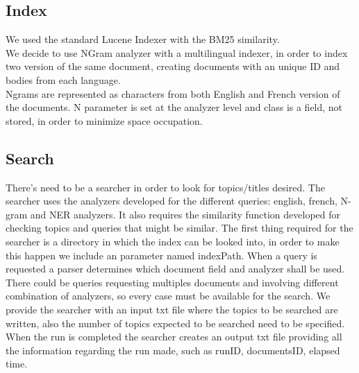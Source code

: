 \subsection{Index}\label{subsec:index}
We used the standard Lucene Indexer with the BM25\cite{BM25} similarity.\\
We decide to use NGram analyzer with a multilingual indexer,
in order to index two version of the same document, creating documents with
an unique ID and bodies from each language.\\
Ngrams are represented as characters from both English and French version of
the documents. N parameter is set at the analyzer level and class is a field,
not stored, in order to minimize space occupation.\\

\subsection{Search}\label{subsec:search}
There's need to be a searcher in order to look for topics/titles desired. The searcher uses the analyzers developed for
the different queries: english, french, N-gram and NER analyzers. It also requires the similarity function developed for
checking topics and queries that might be similar.
The first thing required for the searcher is a directory in which the index can be looked into, in order to make this
happen we include an parameter named indexPath.
When a query is requested a parser determines which document field and analyzer shall be used. There could be queries
requesting multiples documents and involving different combination of analyzers, so every case must be available for the
search.
We provide the searcher with an input txt file where the topics to be searched are written, also the number of topics
expected to be searched need to be specified.
When the run is completed the searcher creates an output txt file providing all the information regarding the run made,
such as runID, documentsID, elapsed time.

